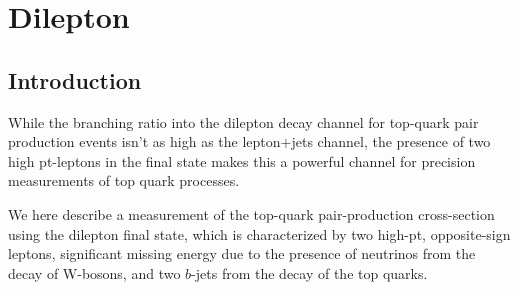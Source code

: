 
\section{Dilepton}


\newcommand{\dr} {\ensuremath{\Delta R({\rm lepton},{\rm jet})}}
\newcommand{\pmasym}[2]{^{+#1}_{-#2}}
\newcommand{\sigmattbar}{\ensuremath{\sigma_{\ttbar}}}
\newcommand{\sigmaz}{\ensuremath{\sigma_{\Zboson}}}
\newcommand{\lumitot}{\mbox{0.70~fb$^{-1}$}}
\newcommand{\lumitotpm}{\mbox{0.70$\pm$0.03~fb$^{-1}$}}


\newcommand{\xsectot}{171}
\newcommand{\xsecstat}{\pm 6}
\newcommand{\xsecsyst}{\pmasym{16}{14}}
\newcommand{\xseclumi}{\pm 8}

\newcommand{\xsecbtot}{177}
\newcommand{\xsecbstat}{\pm 6}
\newcommand{\xsecbsyst}{\pmasym {17}{14}}
\newcommand{\xsecblumi}{\pmasym {8}{7}}


\newcommand{\AKT}{anti-k$_{t}$}
\def\lum{{\ensuremath{\cal L}}}
\def \intlum {\int {\cal L} dt}
\def\MCatNLO{{\sc MC@NLO}}
\def\FigMerit{F_M}
\def\JetProb{{\sc JetProb}}
\def\SVZero{{\sc SV0}}
\def\Nn{N_n}  %
\def\Zg{\Zboson/\gamma^{*}}
\def\GEANT{{\sc GEANT4}}



\subsection{Introduction}

While the branching ratio into the dilepton decay channel for top-quark pair production events
isn't as high as the lepton+jets channel, the presence of two high pt-leptons in the final state
makes this a powerful channel for precision measurements of top quark processes.

We here describe a measurement of the top-quark pair-production cross-section using the
dilepton final state, which is characterized by two high-pt, opposite-sign leptons,
significant missing energy due to the presence of neutrinos from the decay of W-bosons,
and two $b$-jets from the decay of the top quarks.



